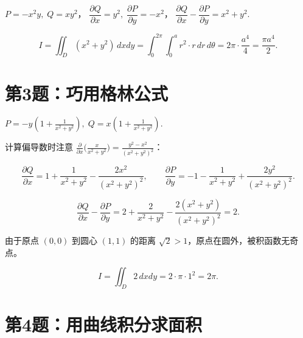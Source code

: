 \documentclass[12pt,a4paper]{ctexart}
\newcommand{\answerbox}[1]{%
  \begin{center}\fbox{\color{red}\large\bfseries #1}\end{center}}
\begin{document}

$P=-x^2y,\;Q=xy^2$，
$\dfrac{\partial Q}{\partial x}=y^2,\;\dfrac{\partial P}{\partial y}=-x^2$，
$\dfrac{\partial Q}{\partial x}-\dfrac{\partial P}{\partial y}=x^2+y^2$.

\[
I = \iint_D (x^2+y^2)\,dxdy
   = \int_0^{2\pi}\int_0^a r^2\cdot r\,dr\,d\theta
   = 2\pi\cdot\frac{a^4}{4}
   = \frac{\pi a^4}{2}.
\]

\answerbox{$I = \dfrac{\pi a^4}{2}$}

\section{第3题：巧用格林公式}


$P=-y(1+\frac{1}{x^2+y^2}),\;Q=x(1+\frac{1}{x^2+y^2})$.

计算偏导数时注意 $\frac{\partial}{\partial x}\bigl(\frac{x}{x^2+y^2}\bigr)=\frac{y^2-x^2}{(x^2+y^2)^2}$：

\[
\frac{\partial Q}{\partial x}=1+\frac{1}{x^2+y^2}-\frac{2x^2}{(x^2+y^2)^2},\qquad
\frac{\partial P}{\partial y}=-1-\frac{1}{x^2+y^2}+\frac{2y^2}{(x^2+y^2)^2}.
\]

\[
\frac{\partial Q}{\partial x}-\frac{\partial P}{\partial y}
=2+\frac{2}{x^2+y^2}-\frac{2(x^2+y^2)}{(x^2+y^2)^2}=2.
\]

由于原点 $(0,0)$ 到圆心 $(1,1)$ 的距离 $\sqrt{2}>1$，原点在圆外，被积函数无奇点。

\[
I = \iint_D 2\,dxdy = 2\cdot\pi\cdot1^2 = 2\pi.
\]

\answerbox{$I = 2\pi$}

\section{第4题：用曲线积分求面积}

\end{document}
